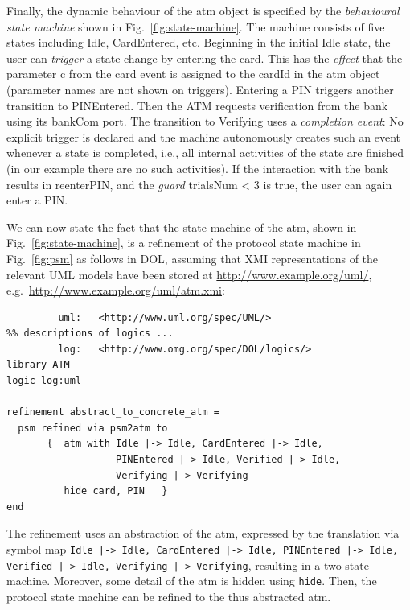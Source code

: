 \documentclass[10pt,fleqn,%
\ifpretendfinal
final%
\else
draft%
\fi,
]{scrreprt}
\newcommand*{\syntax}[1]{\texttt{#1}}
\newcommand{\uml}[1]{\textsf{#1}}
\begin{document}
Finally, the dynamic behaviour of the \uml{atm} object is specified by
the \emph{behavioural state machine} shown in
Fig.~\ref{fig:state-machine}. The machine consists of five states
including \uml{Idle}, \uml{CardEntered}, etc.  Beginning in the
initial \uml{Idle} state, the user can \emph{trigger} a state change
by entering the \uml{card}. This has the \emph{effect} that the
parameter \uml{c} from the \uml{card} event is assigned to the
\uml{cardId} in the \uml{atm} object (parameter names are not shown on
triggers). Entering a \uml{PIN} triggers another transition to
\uml{PINEntered}.  Then the ATM requests verification from the bank
using its \uml{bankCom} port.  The transition to \uml{Verifying} uses
a \emph{completion event}: No explicit trigger is declared and the
machine autonomously creates such an event whenever a state is
completed, i.e., all internal activities of the state are finished (in
our example there are no such activities).  If the interaction with
the bank results in \uml{reenterPIN}, and the \emph{guard}
\uml{trialsNum < 3} is true, the user can again enter a \uml{PIN}.

We can now state the fact that the state machine of the \uml{atm},
shown in Fig.~\ref{fig:state-machine}, is a refinement of the protocol
state machine in Fig.~\ref{fig:psm} as follows in DOL, assuming that
XMI representations of the relevant UML models have been stored at
\url{http://www.example.org/uml/}, e.g.\ \url{http://www.example.org/uml/atm.xmi}:

\begin{lstlisting}[basicstyle=\ttfamily,language=dolText,morekeywords={props,ObjectProperty,Class,DisjointUnionOf,SubClassOf,Characteristics,Transitive,Asymmetric,SubPropertyOf,DisjointClasses,EquivalentTo,inverse,only,forall,iff,if,or,exists,distributed,refinement,library,via},escapechar=@,mathescape]
%prefix( :     <http://www.example.org/uml/>
         uml:   <http://www.uml.org/spec/UML/>
%% descriptions of logics ...		 
         log:   <http://www.omg.org/spec/DOL/logics/>
library ATM
logic log:uml

refinement abstract_to_concrete_atm =
  psm refined via psm2atm to 
       {  atm with Idle |-> Idle, CardEntered |-> Idle, 
                   PINEntered |-> Idle, Verified |-> Idle, 
                   Verifying |-> Verifying 
          hide card, PIN   }
end
\end{lstlisting}

The refinement uses an abstraction of the \uml{atm}, expressed by the
translation via symbol map \texttt{Idle |-> Idle, CardEntered |-> Idle, PINEntered |-> Idle, Verified |-> Idle, Verifying |-> Verifying}, resulting in a two-state machine. Moreover, some detail of the \uml{atm} is hidden using
\syntax{hide}. Then, the protocol state machine can be refined to
the thus abstracted \uml{atm}.
\end{document}
